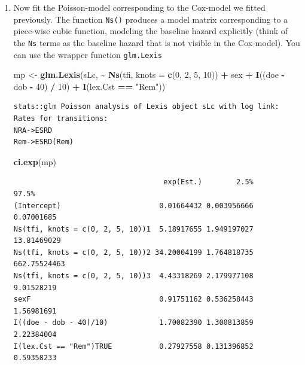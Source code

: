 \documentclass[
]{book}
\newenvironment{Shaded}{\begin{snugshade}}{\end{snugshade}}
\newcommand{\AttributeTok}[1]{\textcolor[rgb]{0.13,0.29,0.53}{#1}}
\newcommand{\DecValTok}[1]{\textcolor[rgb]{0.00,0.00,0.81}{#1}}
\newcommand{\FunctionTok}[1]{\textcolor[rgb]{0.13,0.29,0.53}{\textbf{#1}}}
\newcommand{\NormalTok}[1]{#1}
\newcommand{\OtherTok}[1]{\textcolor[rgb]{0.56,0.35,0.01}{#1}}
\newcommand{\SpecialCharTok}[1]{\textcolor[rgb]{0.81,0.36,0.00}{\textbf{#1}}}
\newcommand{\StringTok}[1]{\textcolor[rgb]{0.31,0.60,0.02}{#1}}
\begin{document}
\begin{enumerate}
\begin{verbatim}

Transitions:
     To
From   NRA  Rem ESRD ESRD(Rem) Records: Events: Risk time: Persons:
  NRA 9854   29   69         0     9952      98     824.77      122
  Rem    0 3139    0         8     3147       8     259.90       32
  Sum 9854 3168   69         8    13099     106    1084.67      125
\end{verbatim}
\item
  Now fit the Poisson-model corresponding to the Cox-model
  we fitted previously. The function \texttt{Ns()} produces a model
  matrix corresponding to a piece-wise cubic function, modeling the
  baseline hazard explicitly (think of the \texttt{Ns} terms as the
  baseline hazard that is not visible in the Cox-model). You
  can use the wrapper function \texttt{glm.Lexis}

\begin{Shaded}
\begin{Highlighting}[]
\NormalTok{mp }\OtherTok{\textless{}{-}} \FunctionTok{glm.Lexis}\NormalTok{(sLc, }
                \SpecialCharTok{\textasciitilde{}} \FunctionTok{Ns}\NormalTok{(tfi, }\AttributeTok{knots =} \FunctionTok{c}\NormalTok{(}\DecValTok{0}\NormalTok{, }\DecValTok{2}\NormalTok{, }\DecValTok{5}\NormalTok{, }\DecValTok{10}\NormalTok{)) }\SpecialCharTok{+}
\NormalTok{                  sex }\SpecialCharTok{+} \FunctionTok{I}\NormalTok{((doe }\SpecialCharTok{{-}}\NormalTok{ dob }\SpecialCharTok{{-}} \DecValTok{40}\NormalTok{) }\SpecialCharTok{/} \DecValTok{10}\NormalTok{) }\SpecialCharTok{+} 
                  \FunctionTok{I}\NormalTok{(lex.Cst }\SpecialCharTok{==} \StringTok{"Rem"}\NormalTok{))}
\end{Highlighting}
\end{Shaded}

\begin{verbatim}
stats::glm Poisson analysis of Lexis object sLc with log link:
Rates for transitions:
NRA->ESRD
Rem->ESRD(Rem)
\end{verbatim}

\begin{Shaded}
\begin{Highlighting}[]
\FunctionTok{ci.exp}\NormalTok{(mp)}
\end{Highlighting}
\end{Shaded}

\begin{verbatim}
                                   exp(Est.)        2.5%        97.5%
(Intercept)                       0.01664432 0.003956666   0.07001685
Ns(tfi, knots = c(0, 2, 5, 10))1  5.18917655 1.949197027  13.81469029
Ns(tfi, knots = c(0, 2, 5, 10))2 34.20004199 1.764818735 662.75524463
Ns(tfi, knots = c(0, 2, 5, 10))3  4.43318269 2.179977108   9.01528219
sexF                              0.91751162 0.536258443   1.56981691
I((doe - dob - 40)/10)            1.70082390 1.300813859   2.22384004
I(lex.Cst == "Rem")TRUE           0.27927558 0.131396852   0.59358233
\end{verbatim}


\end{enumerate}
\end{document}
